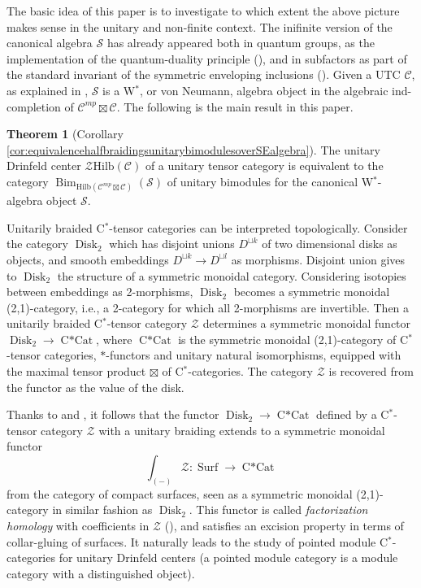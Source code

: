 \documentclass[a4paper,11pt,reqno]{amsart}
\numberwithin{equation}{section}
\theoremstyle{remark}
\theoremstyle{definition}
\newtheorem{theoremAlph}{Theorem}
\newcommand{\cC}{\mathcal C}
\newcommand{\cS}{\mathcal S}
\newcommand{\cZ}{\mathcal Z}
\DeclareMathOperator{\Bim}{Bim}
\DeclareMathOperator{\Surf}{Surf}
\DeclareMathOperator{\CCat}{C*Cat}
\DeclareMathOperator{\Disk}{Disk}
\newcommand{\Hilb}{\mathrm{Hilb}}
\begin{document}
The basic idea of this paper is to investigate to which extent the above picture makes sense in the unitary and non-finite context. The inifinite version of the canonical algebra $\cS$ has already appeared both in quantum groups, as the implementation of the quantum-duality principle (\cites{MR1015339,MR1302020}), and in subfactors as part of the standard invariant of the symmetric enveloping inclusions (\cites{MR3509018,MR3687214}). Given a UTC $\cC$, as explained in \cite{MR3687214}, $\cS$ is a W$^*$, or von Neumann, algebra object in the algebraic ind-completion of $\cC^{mp} \boxtimes \cC$. The following is the main result in this paper.

\begin{theoremAlph}[Corollary \ref{cor:equivalencehalfbraidingsunitarybimodulesoverSEalgebra}]
	The unitary Drinfeld center $\cZ \Hilb(\cC)$ of a unitary tensor category is equivalent to the category  $\Bim_{\Hilb(\cC^{mp} \boxtimes \cC)}(\cS)$ of unitary bimodules for the canonical W$^*$-algebra object $\cS$.
	\label{themA}
\end{theoremAlph}



Unitarily braided C$^*$-tensor categories can be interpreted topologically. Consider the category $\Disk_2$ which has disjoint unions $D^{\sqcup k}$ of two dimensional disks as objects, and smooth embeddings $D^{\sqcup k} \to D^{\sqcup l}$ as morphisms. Disjoint union gives to $\Disk_2$ the structure of a symmetric monoidal category. Considering isotopies between embeddings as 2-morphisms, $\Disk_2$ becomes a symmetric monoidal (2,1)-category, i.e., a 2-category for which all 2-morphisms are invertible. Then a unitarily braided C$^*$-tensor category $\cZ$ determines a symmetric monoidal functor $\Disk_2 \to \CCat$, where $\CCat$ is the symmetric monoidal (2,1)-category of C$^*$-tensor categories, $*$-functors and unitary natural isomorphisms, equipped with the maximal tensor product $\boxtimes$ of C$^*$-categories. The category $\cZ$ is recovered from the functor as the value of the disk.


Thanks to \cite{MR3007088} and  \cite{MR3431668}, it follows that the functor $\Disk_2 \to \CCat$ defined by a  C$^*$-tensor category $\cZ$ with a unitary braiding extends to a symmetric monoidal functor
\[
\int_{(-)} \cZ : \Surf \to \CCat 
\]
from the category of compact surfaces, seen as a symmetric monoidal (2,1)-category in similar fashion as $\Disk_2$.  This functor is called {\em factorization homology}  with coefficients in $\cZ$ (\cites{MR3431668}), and satisfies an excision property in terms of collar-gluing of surfaces.  It naturally leads to the study of pointed module C$^*$-categories for unitary Drinfeld centers (a pointed module category is a module category with a distinguished object). 
\end{document}
